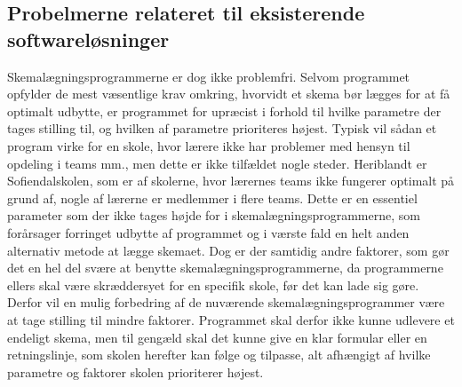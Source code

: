 \subsection{Probelmerne relateret til eksisterende softwareløsninger}
Skemalægningsprogrammerne er dog ikke problemfri. Selvom programmet opfylder de mest væsentlige krav omkring, hvorvidt et skema bør lægges for at få optimalt udbytte, er programmet for upræcist i forhold til hvilke parametre der tages stilling til, og hvilken af parametre prioriteres højest. Typisk vil sådan et program virke for en skole, hvor lærere ikke har problemer med hensyn til opdeling i teams mm., men dette er ikke tilfældet nogle steder. Heriblandt er Sofiendalskolen, som er af skolerne, hvor lærernes teams ikke fungerer optimalt på grund af, nogle af lærerne er medlemmer i flere teams. Dette er en essentiel parameter som der ikke tages højde for i skemalægningsprogrammerne, som forårsager forringet udbytte af programmet og i værste fald en helt anden alternativ metode at lægge skemaet. Dog er der samtidig andre faktorer, som gør det en hel del svære at benytte skemalægningsprogrammerne, da programmerne ellers skal være skræddersyet for en specifik skole, før det kan lade sig gøre.
Derfor vil en mulig forbedring af de nuværende skemalægningsprogrammer være at tage stilling til mindre faktorer. Programmet skal derfor ikke kunne udlevere et endeligt skema, men til gengæld skal det kunne give en klar formular eller en retningslinje, som skolen herefter kan følge og tilpasse, alt afhængigt af hvilke parametre og faktorer skolen prioriterer højest.